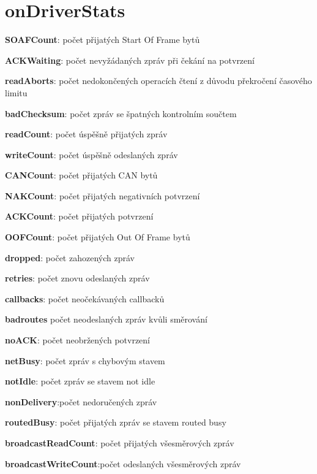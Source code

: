 \documentclass[thesis=M,czech]{FITthesis}[2012/06/26]
\begin{document}
\section{onDriverStats}
\begin{description}
 \item \textbf{SOAFCount}: počet přijatých Start Of Frame bytů
 \item \textbf{ACKWaiting}: počet nevyžádaných zpráv při čekání na potvrzení
 \item \textbf{readAborts}: počet nedokončených operacích čtení z důvodu překročení časového limitu
 \item \textbf{badChecksum}: počet zpráv se špatných kontrolním součtem
 \item \textbf{readCount}: počet úspěšně přijatých zpráv
 \item \textbf{writeCount}: počet úspěšně odeslaných zpráv
 \item \textbf{CANCount}: počet přijatých CAN bytů
 \item \textbf{NAKCount}: počet přijatých negativních potvrzení
 \item \textbf{ACKCount}: počet přijatých potvrzení
 \item \textbf{OOFCount}: počet přijatých Out Of Frame bytů
 \item \textbf{dropped}: počet zahozených zpráv 
 \item \textbf{retries}: počet znovu odeslaných zpráv
 \item \textbf{callbacks}: počet neočekávaných callbacků
 \item \textbf{badroutes} počet neodeslaných zpráv kvůli směrování
 \item \textbf{noACK}: počet neobržených potvrzení
 \item \textbf{netBusy}: počet zpráv s chybovým stavem
 \item \textbf{notIdle}: počet zpráv se stavem not idle
 \item \textbf{nonDelivery}:počet nedoručených zpráv
 \item \textbf{routedBusy}:  počet přijatých zpráv se stavem routed busy
 \item \textbf{broadcastReadCount}: počet přijatých všesměrových zpráv
 \item \textbf{broadcastWriteCount}:počet odeslaných všesměrových zpráv
\end{description}
\end{document}
